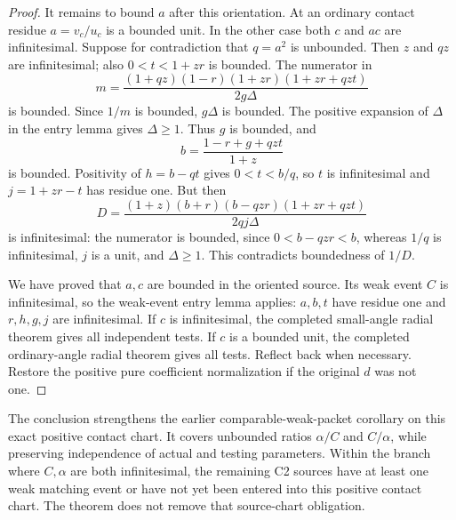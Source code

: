 \begin{proof}
It remains to bound $a$ after this orientation. At an ordinary contact
residue $a=v_c/u_c$ is a bounded unit. In the other case both $c$ and
$ac$ are infinitesimal. Suppose for contradiction that $q=a^2$ is
unbounded. Then $z$ and $qz$ are infinitesimal; also
$0<t<1+zr$ is bounded. The numerator in
\[
 m=\frac{(1+qz)(1-r)(1+zr)(1+zr+qzt)}{2g\Delta}
\]
is bounded. Since $1/m$ is bounded, $g\Delta$ is bounded.
The positive expansion of $\Delta$ in the entry lemma gives
$\Delta\ge1$. Thus $g$ is bounded, and
\[
 b=\frac{1-r+g+qzt}{1+z}
\]
is bounded. Positivity of $h=b-qt$ gives $0<t<b/q$, so $t$ is
infinitesimal and $j=1+zr-t$ has residue one. But then
\[
 D=\frac{(1+z)(b+r)(b-qzr)(1+zr+qzt)}{2qj\Delta}
\]
is infinitesimal: the numerator is bounded, since $0<b-qzr<b$,
whereas $1/q$ is infinitesimal, $j$ is a unit, and $\Delta\ge1$.
This contradicts boundedness of $1/D$.

We have proved that $a,c$ are bounded in the oriented source. Its
weak event $C$ is infinitesimal, so the weak-event entry lemma applies:
$a,b,t$ have residue one and $r,h,g,j$ are infinitesimal. If $c$ is
infinitesimal, the completed small-angle radial theorem gives all
independent tests. If $c$ is a bounded unit, the completed ordinary-angle
radial theorem gives all tests. Reflect back when necessary. Restore the
positive pure coefficient normalization if the original $d$ was not one.
\end{proof}

The conclusion strengthens the earlier comparable-weak-packet corollary
on this exact positive contact chart. It covers unbounded ratios
$\alpha/C$ and $C/\alpha$, while preserving independence of actual and
testing parameters. Within the branch where $C,\alpha$ are both infinitesimal, the remaining
C2 sources have at least one weak matching event or have not yet been
entered into this positive contact chart. The theorem does not remove that source-chart obligation.

